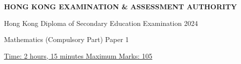 \documentclass[11pt,paper=a4,answers]{exam}
\begin{document}
\noindent
\begin{minipage}[r]{\textwidth}%
\begin{center}
    {\bfseries HONG KONG EXAMINATION \& ASSESSMENT AUTHORITY 
        \par \vspace{0.5cm}
        Hong Kong Diploma of Secondary Education Examination 2024
        \par
    \Large Mathematics (Compulsory Part) Paper 1 \\[2pt]
    \vspace{0.5cm}
    }
\end{center}
\end{minipage}
\par
\noindent
\uline{Time: 2 hours, 15 minutes   
\hfill Maximum Marks: 105}

\begin{center}
\vspace{0.1in}
\end{center}
\end{document}
